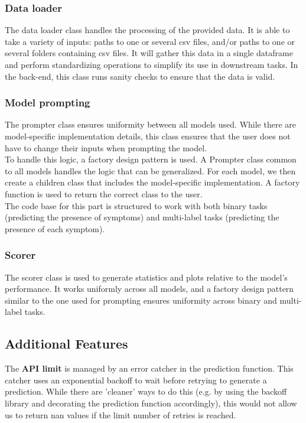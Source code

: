 \documentclass[11pt]{article}
\begin{document}
\subsubsection{Data loader}
The data loader class handles the processing of the provided data. It is able to take a variety of inputs: paths to one or several csv files, and/or paths to one or several folders containing csv files. It will gather this data in a single dataframe and perform standardizing operations to simplify its use in downstream tasks. In the back-end, this class runs sanity checks to ensure that the data is valid.

\subsubsection{Model prompting}
The prompter class ensures uniformity between all models used. While there are model-specific implementation details, this class ensures that the user does not have to change their inputs when prompting the model.\\

To handle this logic, a factory design pattern is used. A Prompter class common to all models handles the logic that can be generalized. For each model, we then create a children class that includes the model-specific implementation. A factory function is used to return the correct class to the user.\\

The code base for this part is structured to work with both binary tasks (predicting the presence of symptoms) and multi-label tasks (predicting the presence of each symptom).

\subsubsection{Scorer}
The scorer class is used to generate statistics and plots relative to the model's performance. It works uniformly across all models, and a factory design pattern similar to the one used for prompting ensures uniformity across binary and multi-label tasks.

\subsection{Additional Features}

The \textbf{API limit} is managed by an error catcher in the prediction function. This catcher uses an exponential backoff to wait before retrying to generate a prediction. While there are 'cleaner' ways to do this (e.g. by using the backoff library and decorating the prediction function accordingly), this would not allow us to return nan values if the limit number of retries is reached.\\
\end{document}
